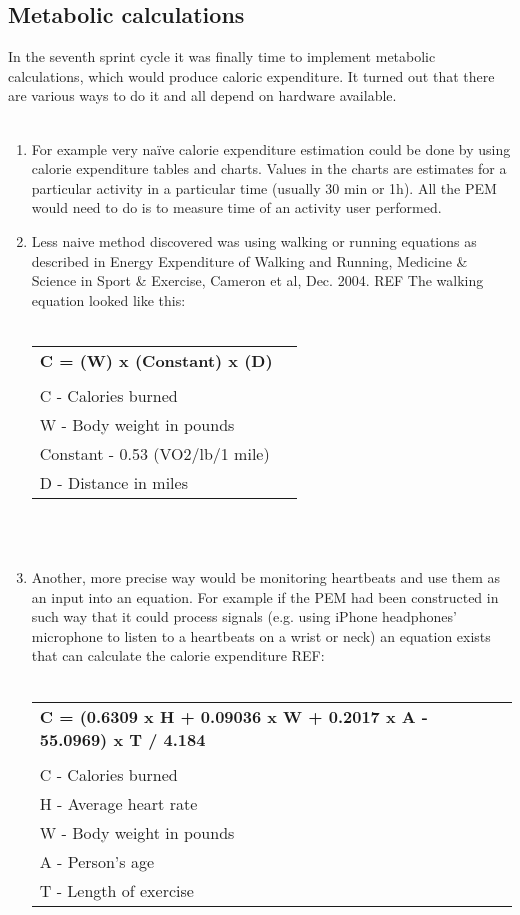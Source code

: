 \documentclass[12pt, a4paper]{report}   %
\begin{document}
\begin{enumerate}
\clearpage
\section{Metabolic calculations}
In the seventh sprint cycle it was finally time to implement metabolic calculations, which would produce caloric expenditure. It turned out that there are various ways to do it and all depend on hardware available.\\ \\

\begin{enumerate}
	\item For example very naïve calorie expenditure estimation could be done by using calorie expenditure tables and charts. Values in the charts are estimates for a particular activity in a particular time (usually 30 min or 1h). All the PEM would need to do is to measure time of an activity user performed.\\
	\item Less naive method discovered was using walking or running equations as described in Energy Expenditure of Walking and Running, Medicine \& Science in Sport \& Exercise, Cameron et al, Dec. 2004. REF The walking equation looked like this:\\ \\

\begin{tabular}{ll}
\textbf{C = (W) x (Constant) x (D)}\\ \\
C - Calories burned\\
W - Body weight in pounds\\
Constant - 0.53 (VO2/lb/1 mile)\\
D - Distance in miles\\
\end{tabular}\\ \\


	\item Another, more precise way would be monitoring heartbeats and use them as an input into an equation. For example if the PEM had been constructed in such way that it could process signals (e.g. using iPhone headphones' microphone to listen to a heartbeats on a wrist or neck) an equation exists that can calculate the calorie expenditure REF:\\ \\


\begin{tabular}{ll}
\textbf{C = (0.6309 x H + 0.09036 x W + 0.2017 x A - 55.0969) x T / 4.184}\\ \\
C - Calories burned\\
H - Average heart rate\\
W - Body weight in pounds\\
A - Person's age\\
T - Length of exercise\\
\end{tabular}\\ \\



\end{enumerate}
\end{enumerate}
\end{document}
